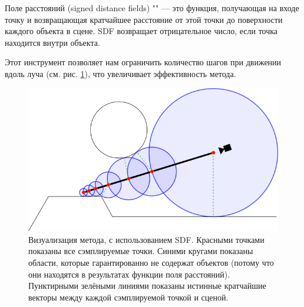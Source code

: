 Поле расстояний (signed distance fields) "" --- это функция, получающая на входе точку и возвращающая кратчайшее расстояние от этой точки до поверхности каждого объекта в сцене. 
SDF возвращает отрицательное число, если точка находится внутри объекта. 

Этот инструмент позволяет нам ограничить количество шагов при движении вдоль луча (см. рис. \ref{fig:raymarch_3}),
что увеличивает эффективность метода.\\
\begin{figure}
  \centering
  \includegraphics[scale=0.8]{inc/img/raymarch_3}
  \caption{Визуализация метода, с использованием SDF. Красными точками показаны все сэмплируемые точки. Синими кругами показаны области, которые гарантированно не содержат объектов (потому что они находятся в результатах функции поля расстояний). Пунктирными зелёными линиями показаны истинные кратчайшие векторы между каждой сэмплируемой точкой и сценой.}
  \label{fig:raymarch_3}
\end{figure}

